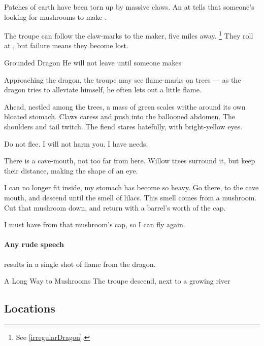 \documentclass[10pt,twoside]{book}
\begin{document}
Patches of earth have been torn up by massive claws.
An  at \tn[12] tells  that someone's looking for mushrooms to make .

The troupe can follow the claw-marks to the maker, five miles away.%
\footnote{See \vref{irregularDragon}.}
They roll  at \tn[6], but failure means they become lost.

{Grounded Dragon}%
{He will not leave until someone makes }%

\label{irregularDragon}

Approaching the dragon, the troupe may see flame-marks on trees --- as the dragon tries to alleviate himself, he often lets out a little flame.

\begin{boxtext}
  Ahead, nestled among the trees, a mass of green scales writhe around its own bloated stomach.
  Claws caress and push into the ballooned abdomen.
  The shoulders and tail twitch.
  The \gls{fiend} stares hatefully, with bright-yellow eyes.
\end{boxtext}

\begin{speechtext}
  Do not flee.
  I will not harm you.
  I have needs.

  There is a cave-mouth, not too far from here.
  Willow trees surround it, but keep their distance, making the shape of an eye.

  I can no longer fit inside, my stomach has become so heavy.
  Go there, to the cave mouth, and descend until the smell of lilacs.
  This smell comes from a mushroom.
  Cut that mushroom down, and return with a barrel's worth of the cap.

  I must have  from that mushroom's cap, so I can fly again.
\end{speechtext}

\dragon

\paragraph{Any rude speech}
results in a single shot of flame from the dragon.

{A Long Way to Mushrooms}%
{The troupe descend, next to a growing river}%




\subsection{Locations}
\end{document}
